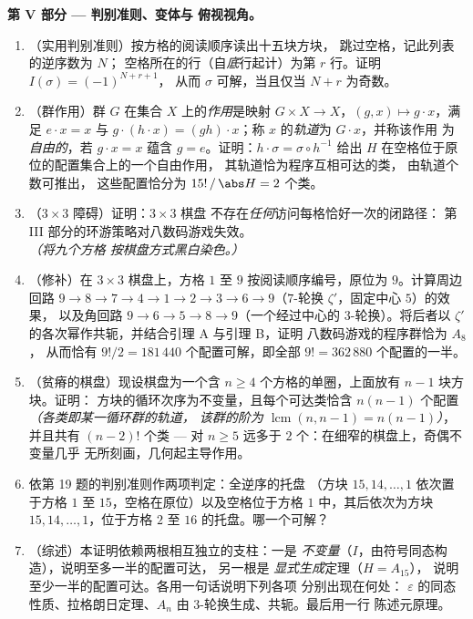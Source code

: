 \begin{problem}
\medskip
\noindent\textbf{第 V 部分 --- 判别准则、变体与
俯视视角。}
\begin{enumerate}[resume]
  \item （实用判别准则）按方格的阅读顺序读出十五块方块，
        跳过空格，记此列表的逆序数为 $N$；
        空格所在的行（自\emph{底}行起计）为第 $r$ 行。证明
        $I(\sigma) = (-1)^{N + r + 1}$，
        从而 $\sigma$ 可解，当且仅当
        $N + r$ 为奇数。
  \item （群作用）群 $G$ 在集合
        $X$ 上的\emph{作用}是映射 $G \times X \to X$，$(g, x) \mapsto g \cdot
        x$，满足 $e \cdot x = x$ 与 $g \cdot (h \cdot x) =
        (gh) \cdot x$；称 $x$ 的\emph{轨道}为 $G \cdot x$，并称该作用
        为\emph{自由的}，若 $g \cdot x = x$ 蕴含 $g =
        e$。证明：$h \cdot \sigma = \sigma \circ h^{-1}$
        给出 $H$ 在空格位于原位的配置集合上的一个自由作用，
        其轨道恰为程序互相可达的类，
        由轨道个数可推出，
        这些配置恰分为
        $15!\,/\,\abs H = 2$ 个类。
  \item （$3 \times 3$ 障碍）证明：$3 \times 3$ 棋盘
        不存在\emph{任何}访问每格恰好一次的闭路径：
        第 III 部分的环游策略对八数码游戏失效。
        \emph{（将九个方格
        按棋盘方式黑白染色。）}
  \item （修补）在 $3 \times 3$ 棋盘上，方格 $1$ 至
        $9$ 按阅读顺序编号，原位为 $9$。计算周边回路
        $9 \to 8 \to 7 \to 4 \to 1 \to 2 \to 3
        \to 6 \to 9$（$7$-轮换 $\zeta'$，固定中心 $5$）的效果，
        以及角回路 $9 \to 6 \to 5 \to 8 \to 9$（一个经过中心的
        $3$-轮换）。将后者以
        $\zeta'$ 的各次幂作共轭，并结合引理 A 与引理 B，证明
        八数码游戏的程序群恰为 $A_8$，
        从而恰有 $9!/2 = 181\,440$ 个配置可解，即全部 $9! =
        362\,880$ 个配置的一半。
  \item （贫瘠的棋盘）现设棋盘为一个含 $n
        \geq 4$ 个方格的单圈，上面放有 $n - 1$ 块方块。证明：
        方块的循环次序为不变量，且每个可达类恰含
        $n(n - 1)$ 个配置\emph{（各类即某一循环群的轨道，
        该群的阶为
        $\operatorname{lcm}(n, n-1) = n(n-1)$）}，并且共有
        $(n - 2)!$ 个类 --- 对 $n \geq 5$ 远多于
        $2$ 个：在细窄的棋盘上，奇偶不变量几乎
        无所刻画，几何起主导作用。
  \item 依第 19 题的判别准则作两项判定：全逆序的托盘
        （方块 $15, 14, \dots, 1$ 依次置于方格 $1$ 至
        $15$，空格在原位）以及空格位于方格
        $1$ 中，其后依次为方块 $15, 14, \dots, 1$，位于方格 $2$
        至 $16$ 的托盘。哪一个可解？
  \item （综述）本证明依赖两根相互独立的支柱：一是
        \emph{不变量}（$I$，由符号同态构造），说明至多一半的配置可达，
        另一根是
        \emph{显式生成}定理（$H = A_{15}$），
        说明至少一半的配置可达。各用一句话说明下列各项
        分别出现在何处：
        $\varepsilon$ 的同态性质、拉格朗日定理、$A_n$ 由
        $3$-轮换生成、共轭。最后用一行
        陈述元原理。
\end{enumerate}
\end{problem}

